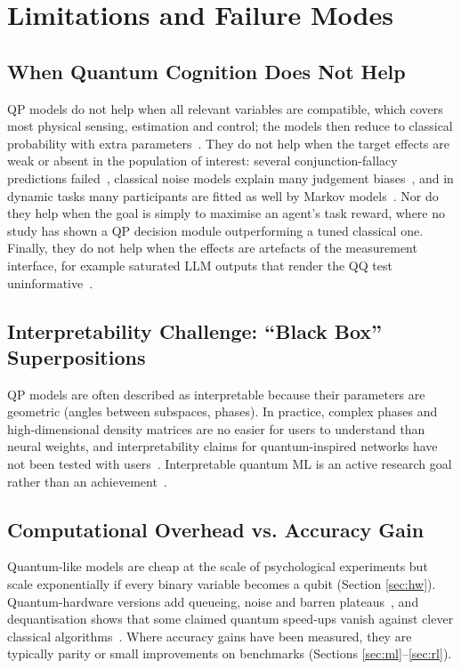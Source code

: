 \documentclass[pdflatex,sn-basic]{sn-jnl}
\begin{document}
\section{Limitations and Failure Modes}\label{sec:limits}

\subsection{When Quantum Cognition Does Not Help}\label{sec:nohelp}
QP models do not help when all relevant variables are compatible, which covers most physical sensing, estimation and control; the models then reduce to classical probability with extra parameters~\citep{Bruza2015}. They do not help when the target effects are weak or absent in the population of interest: several conjunction-fallacy predictions failed~\citep{BoyerKassem2016}, classical noise models explain many judgement biases~\citep{Costello2014,Costello2018}, and in dynamic tasks many participants are fitted as well by Markov models~\citep{Epping2023}. Nor do they help when the goal is simply to maximise an agent's task reward, where no study has shown a QP decision module outperforming a tuned classical one. Finally, they do not help when the effects are artefacts of the measurement interface, for example saturated LLM outputs that render the QQ test uninformative~\citep{Kang2026}.

\subsection{Interpretability Challenge: ``Black Box'' Superpositions}\label{sec:interp}
QP models are often described as interpretable because their parameters are geometric (angles between subspaces, phases). In practice, complex phases and high-dimensional density matrices are no easier for users to understand than neural weights, and interpretability claims for quantum-inspired networks have not been tested with users~\citep{Li2019,Li2021b}. Interpretable quantum ML is an active research goal rather than an achievement~\citep{Flamini2024}.

\subsection{Computational Overhead vs. Accuracy Gain}\label{sec:compute}
Quantum-like models are cheap at the scale of psychological experiments but scale exponentially if every binary variable becomes a qubit (Section \ref{sec:hw}). Quantum-hardware versions add queueing, noise and barren plateaus~\citep{Preskill2018,Cerezo2021}, and dequantisation shows that some claimed quantum speed-ups vanish against clever classical algorithms~\citep{Tang2019,Aaronson2015}. Where accuracy gains have been measured, they are typically parity or small improvements on benchmarks (Sections \ref{sec:ml}--\ref{sec:rl}).
\end{document}
